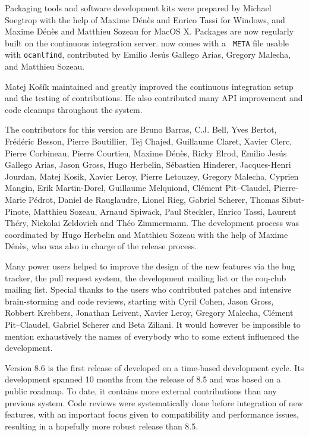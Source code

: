 Packaging tools and software development kits were prepared by Michael
Soegtrop with the help of Maxime Dénès and Enrico Tassi for Windows, and
Maxime Dénès and Matthieu Sozeau for MacOS X. Packages are now regularly
built on the continuous integration server. {\Coq} now comes with a {\tt
  META} file usable with {\tt ocamlfind}, contributed by Emilio Jesús
Gallego Arias, Gregory Malecha, and Matthieu Sozeau.

Matej Košík maintained and greatly improved the continuous integration
setup and the testing of {\Coq} contributions. He also contributed many
API improvement and code cleanups throughout the system.

The contributors for this version are Bruno Barras, C.J. Bell, Yves
Bertot, Frédéric Besson, Pierre Boutillier, Tej Chajed, Guillaume
Claret, Xavier Clerc, Pierre Corbineau, Pierre Courtieu, Maxime Dénès,
Ricky Elrod, Emilio Jesús Gallego Arias, Jason Gross, Hugo Herbelin,
Sébastien Hinderer, Jacques-Henri Jourdan, Matej Kosik, Xavier Leroy,
Pierre Letouzey, Gregory Malecha, Cyprien Mangin, Erik Martin-Dorel,
Guillaume Melquiond, Clément Pit--Claudel, Pierre-Marie Pédrot, Daniel
de Rauglaudre, Lionel Rieg, Gabriel Scherer, Thomas Sibut-Pinote,
Matthieu Sozeau, Arnaud Spiwack, Paul Steckler, Enrico Tassi, Laurent
Théry, Nickolai Zeldovich and Théo Zimmermann. The development process
was coordinated by Hugo Herbelin and Matthieu Sozeau with the help of
Maxime Dénès, who was also in charge of the release process.

Many power users helped to improve the design of the new features via
the bug tracker, the pull request system, the {\Coq} development mailing
list or the coq-club mailing list. Special thanks to the users who
contributed patches and intensive brain-storming and code reviews,
starting with Cyril Cohen, Jason Gross, Robbert Krebbers, Jonathan
Leivent, Xavier Leroy, Gregory Malecha, Clément Pit--Claudel, Gabriel
Scherer and Beta Ziliani. It would however be impossible to mention
exhaustively the names of everybody who to some extent influenced the
development.

Version 8.6 is the first release of {\Coq} developed on a time-based
development cycle. Its development spanned 10 months from the release of
{\Coq} 8.5 and was based on a public roadmap. To date, it contains more
external contributions than any previous {\Coq} system. Code reviews
were systematically done before integration of new features, with an
important focus given to compatibility and performance issues, resulting
in a hopefully more robust release than {\Coq} 8.5.

